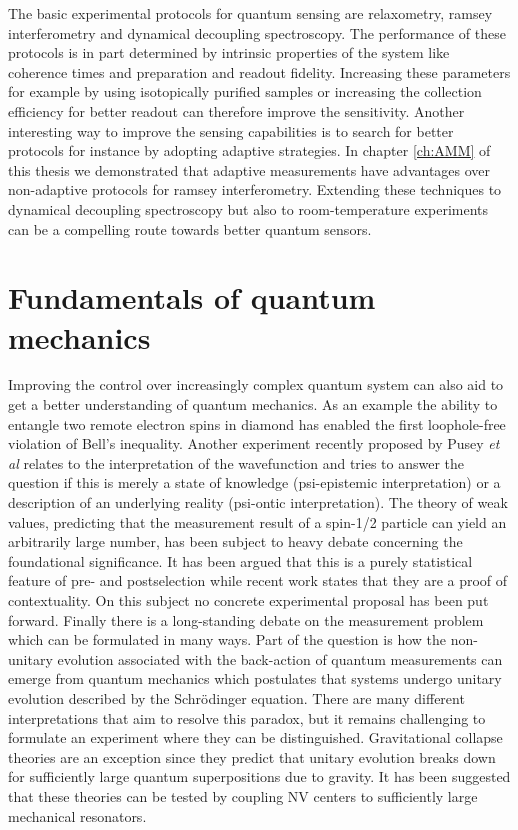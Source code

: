 The basic experimental protocols for quantum sensing are relaxometry, ramsey interferometry and dynamical decoupling spectroscopy. The performance of these protocols is in part determined by intrinsic properties of the system like coherence times and preparation and readout fidelity. Increasing these parameters for example by using isotopically purified samples or increasing the collection efficiency for better readout can therefore improve the sensitivity. Another interesting way to improve the sensing capabilities is to search for better protocols for instance by adopting adaptive strategies. In chapter \ref{ch:AMM} of this thesis we demonstrated that adaptive measurements have advantages over non-adaptive protocols for ramsey interferometry. Extending these techniques to dynamical decoupling spectroscopy but also to room-temperature experiments can be a compelling route towards better quantum sensors.

\section{Fundamentals of quantum mechanics}

Improving the control over increasingly complex quantum system can also aid to get a better understanding of quantum mechanics. As an example the ability to entangle two remote electron spins in diamond has enabled the first loophole-free violation of Bell's inequality\cite{Hensen_arXiv_2015}. Another experiment recently proposed by Pusey \textit{et al}\cite{Pusey_NatPhys_2012} relates to the interpretation of the wavefunction and tries to answer the question if this is merely a state of knowledge (psi-epistemic interpretation) or a description of an underlying reality (psi-ontic interpretation). The theory of weak values, predicting that the measurement result of a spin-1/2 particle can yield an arbitrarily large number, has been subject to heavy debate concerning the foundational significance. It has been argued that this is a purely statistical feature of pre- and postselection\cite{Ferrie_Phys.Rev.Lett._2014} while recent work states that they are a proof of contextuality\cite{Pusey_Phys.Rev.Lett._2014}. On this subject no concrete experimental proposal has been put forward.
Finally there is a long-standing debate on the measurement problem which can be formulated in many ways. Part of the question is how the non-unitary evolution associated with the back-action of quantum measurements can emerge from quantum mechanics which postulates that systems undergo unitary evolution described by the Schr\"{o}dinger equation. There are many different interpretations that aim to resolve this paradox, but it remains challenging to formulate an experiment where they can be distinguished. Gravitational collapse theories are an exception since they predict that unitary evolution breaks down for sufficiently large quantum superpositions due to gravity\cite{Diosi_PhysicsLettersA_1987,Penrose_Phil.Trans.R.Soc.Lond.A_1998}. It has been suggested that these theories can be tested by coupling NV centers to sufficiently large mechanical resonators.\cite{Wezel_Proc.R.Soc.A_2012}



